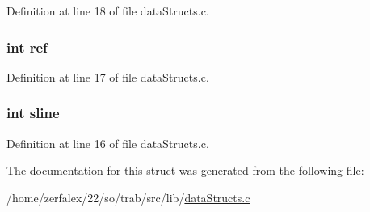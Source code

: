 Definition at line 18 of file data\+Structs.\+c.

\subsubsection[{\texorpdfstring{ref}{ref}}]{\setlength{\rightskip}{0pt plus 5cm}int ref}\hypertarget{structthing_adb528a1cb1ca190150183394d082590d}{}\label{structthing_adb528a1cb1ca190150183394d082590d}


Definition at line 17 of file data\+Structs.\+c.

\subsubsection[{\texorpdfstring{sline}{sline}}]{\setlength{\rightskip}{0pt plus 5cm}int sline}\hypertarget{structthing_a8260a04cd33e11250d7680ccd06af2fc}{}\label{structthing_a8260a04cd33e11250d7680ccd06af2fc}


Definition at line 16 of file data\+Structs.\+c.



The documentation for this struct was generated from the following file\+:\begin{DoxyCompactItemize}
\item 
/home/zerfalex/22/so/trab/src/lib/\hyperlink{data_structs_8c}{data\+Structs.\+c}\end{DoxyCompactItemize}
